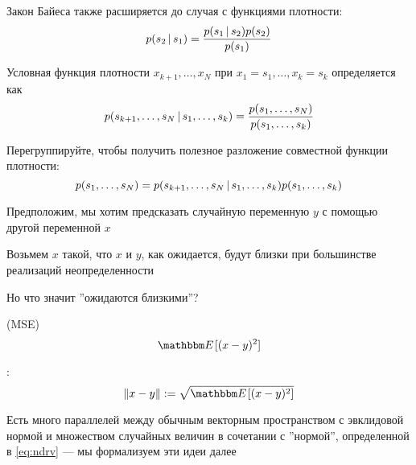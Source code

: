 \begin{frame}

    \vspace{2em}
    Закон Байеса также расширяется до случая с функциями плотности:
    \begin{equation*}
        \label{eq:brdc}
        p(s_2 \, | \, s_1) = \frac{p(s_1 \, | \, s_2) p(s_2)}{p(s_1)}
    \end{equation*}

\end{frame}

\begin{frame}

    \vspace{2em}
    Условная функция плотности $x_{k+1},\ldots, x_N$ при $x_1 = s_1,\ldots, x_k =
    s_k$ определяется как
    \begin{equation*}
        \label{eq:condden}
        p(s_{k+1},\ldots,s_N \, | \, s_1,\ldots,s_k) 
            = \frac{p(s_1,\ldots,s_N)}{p(s_1,\ldots,s_k)}
    \end{equation*}
    
    \vspace{1em}
    Перегруппируйте, чтобы получить полезное разложение совместной функции плотности:
    \begin{equation*}
        \label{eq:decompjd}
        p(s_1,\ldots,s_N) 
        = p(s_{k+1},\ldots,s_N \, | \, s_1,\ldots,s_k) p(s_1,\ldots,s_k)
    \end{equation*}
    
\end{frame}

\begin{frame}

    \vspace{2em}
    Предположим, мы хотим предсказать случайную переменную $y$ с помощью другой переменной $x$
    
    Возьмем $x$ такой, что $x$ и $y$, как ожидается, будут близки при большинстве реализаций неопределенности
    
    \vspace{1em}
    Но что значит ''ожидаются близкими''?
    
\end{frame}

\begin{frame}

    \vspace{2em}
     (MSE)
    $$\EE [ (x -
    y)^2 ]$$
    
    :
    \begin{equation}
        \label{eq:ndrv}
        \| x - y \| := \sqrt{ \EE [ (x - y)^2 ] }
    \end{equation}
     
    Есть много параллелей между обычным векторным пространством с эвклидовой нормой и 
    множеством случайных величин в сочетании с ''нормой'', определенной в \eqref{eq:ndrv} 
    --- мы формализуем эти идеи далее
    
\end{frame}

